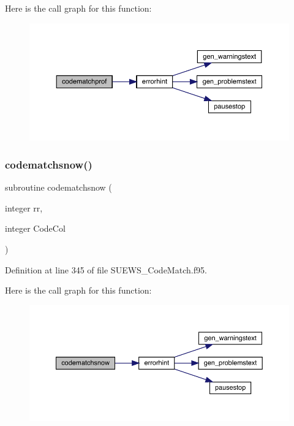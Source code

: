 Here is the call graph for this function\+:\nopagebreak
\begin{figure}[H]
\begin{center}
\leavevmode
\includegraphics[width=350pt]{_s_u_e_w_s___code_match_8f95_a835fa5788ff93415350c246bf2f11f2b_cgraph}
\end{center}
\end{figure}
\mbox{\label{_s_u_e_w_s___code_match_8f95_abd63f392ad47ccd2ff25c6065b26779e}} 
\subsubsection{\texorpdfstring{codematchsnow()}{codematchsnow()}}
{\footnotesize\ttfamily subroutine codematchsnow (\begin{DoxyParamCaption}\item[{integer}]{rr,  }\item[{integer}]{Code\+Col }\end{DoxyParamCaption})}



Definition at line 345 of file S\+U\+E\+W\+S\+\_\+\+Code\+Match.\+f95.

Here is the call graph for this function\+:\nopagebreak
\begin{figure}[H]
\begin{center}
\leavevmode
\includegraphics[width=350pt]{_s_u_e_w_s___code_match_8f95_abd63f392ad47ccd2ff25c6065b26779e_cgraph}
\end{center}
\end{figure}
\mbox{\label{_s_u_e_w_s___code_match_8f95_a2121726d61441ffb4d7f4cfb991b3e48}} 
